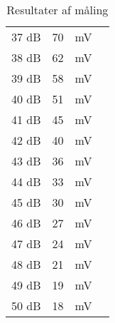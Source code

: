 \begin{table}[h]
\begin{tabular}{l|c|c|l}
37 dB & 70 & mV \\[4pt]
38 dB & 62 & mV \\[4pt]
39 dB & 58 & mV \\[4pt]
40 dB & 51 & mV \\[4pt]
41 dB & 45 & mV \\[4pt]
42 dB & 40 & mV \\[4pt]
43 dB & 36 & mV \\[4pt]
44 dB & 33 & mV \\[4pt]
45 dB & 30 & mV \\[4pt]
46 dB & 27 & mV \\[4pt]
47 dB & 24 & mV \\[4pt]
48 dB & 21 & mV \\[4pt]
49 dB & 19 & mV \\[4pt]
50 dB & 18 & mV \\
\hline\hline
\end{tabular}
\caption{Resultater af måling}
\label{tab:resultat_volumenkontrol}
\end{table}

